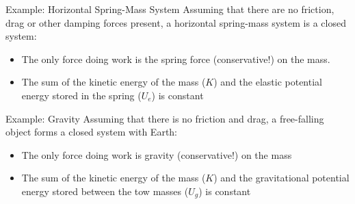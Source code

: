 \documentclass[12pt,compress,aspectratio=169]{beamer}
\begin{document}
\begin{frame}{Example: Horizontal Spring-Mass System}
  Assuming that there are no friction, drag or other damping forces present, a
  horizontal spring-mass system is a closed system:
  \begin{center}
  \end{center}
  \begin{itemize}
  \item The only force doing work is the spring force (conservative!) on the
    mass.
  \item The sum of the kinetic energy of the mass ($K$) and the elastic
    potential energy stored in the spring ($U_e$) is constant

  \end{itemize}
\end{frame}



\begin{frame}{Example: Gravity}
  Assuming that there is no friction and drag, a free-falling object forms a
  closed system with Earth:
  \begin{center}
  \end{center}
  \begin{itemize}
  \item The only force doing work is gravity (conservative!) on the mass
  \item The sum of the kinetic energy of the mass ($K$) and the gravitational
    potential energy stored between the tow masses ($U_g$) is constant
    
  \end{itemize}
\end{frame}
\end{document}
